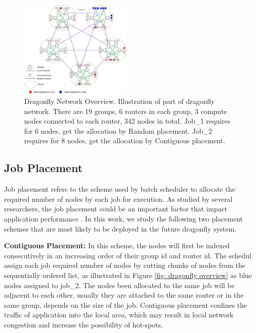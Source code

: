 \documentclass[conference,compsoc]{IEEEtran}
\begin{document}
\begin{figure}[h!] 
  \centering
  \includegraphics[width=0.48\textwidth]{dragonfly-overview}
  \caption{Dragonfly Network Overview. Illustration of part of dragonfly network. There are 19 groups, 6 routers in each group, 3 compute nodes connected to each router, 342 nodes in total. Job\_1 requires for 6 nodes, get the allocation by Random placement. Job\_2 requires for 8 nodes, get the allocation by Contiguous placement. }
  \label{fig:dragonfly overview}
\end{figure}


\subsection{Job Placement}
\label{sec:placement-routing}

Job placement refers to the scheme used by batch scheduler to allocate the required number of nodes by each job for execution. As studied by several researchers, the job placement could be an important factor that impact application performance \cite{hoefler-hpdc14} \cite{bhatele-sc11} \cite{jain-sc14}. In this work, we study the following two placement schemes that are most likely to be deployed in the future dragonfly system.

\textbf{Contiguous Placement:} In this scheme, the nodes will first be indexed consecutively in an increasing order of their group id and router id. The schedul assign each job required number of nodes by cutting chunks of nodes from the sequentially ordered list, as illustrated in Figure \ref{fig: dragonfly overview} as blue nodes assigned to job\_2. The nodes been allocated to the same job will be adjacent to each other, usually they are attached to the same router or in the same group, depends on the size of the job. Contiguous placement confines the traffic of application into the local area, which may result in local network congestion and increase the possibility of hot-spots. 
\end{document}
